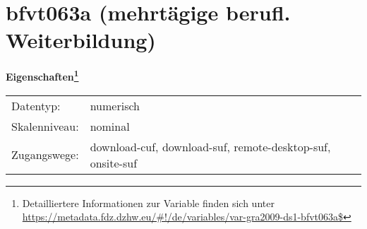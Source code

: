 
    \setcounter{footnote}{0}

    \vspace*{-1.8cm}
	\section{bfvt063a (mehrtägige berufl. Weiterbildung)}
	\label{section:bfvt063a}



    \vspace*{0.5cm}
    \noindent\textbf{Eigenschaften\footnote{Detailliertere Informationen zur Variable finden sich unter
		\url{https://metadata.fdz.dzhw.eu/\#!/de/variables/var-gra2009-ds1-bfvt063a$}}}\\
	\begin{tabularx}{\hsize}{@{}lX}
	Datentyp: & numerisch \\
	Skalenniveau: & nominal \\
	Zugangswege: &
	  download-cuf, 
	  download-suf, 
	  remote-desktop-suf, 
	  onsite-suf
 \\
    \end{tabularx}




